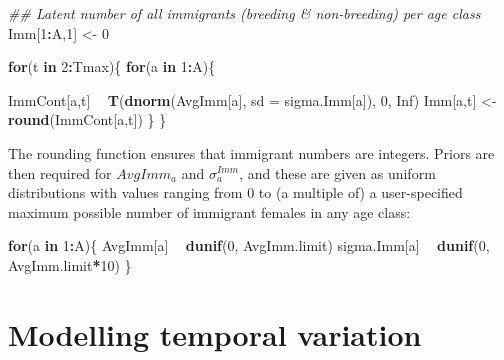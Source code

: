 \documentclass[
]{book}
\newenvironment{Shaded}{\begin{snugshade}}{\end{snugshade}}
\newcommand{\CommentTok}[1]{\textcolor[rgb]{0.56,0.35,0.01}{\textit{#1}}}
\newcommand{\ControlFlowTok}[1]{\textcolor[rgb]{0.13,0.29,0.53}{\textbf{#1}}}
\newcommand{\DataTypeTok}[1]{\textcolor[rgb]{0.13,0.29,0.53}{#1}}
\newcommand{\DecValTok}[1]{\textcolor[rgb]{0.00,0.00,0.81}{#1}}
\newcommand{\KeywordTok}[1]{\textcolor[rgb]{0.13,0.29,0.53}{\textbf{#1}}}
\newcommand{\NormalTok}[1]{#1}
\newcommand{\OperatorTok}[1]{\textcolor[rgb]{0.81,0.36,0.00}{\textbf{#1}}}
\newcommand{\OtherTok}[1]{\textcolor[rgb]{0.56,0.35,0.01}{#1}}
\newcommand{\StringTok}[1]{\textcolor[rgb]{0.31,0.60,0.02}{#1}}
\begin{document}
\begin{Shaded}
\begin{Highlighting}[]
     \CommentTok{## Latent number of all immigrants (breeding & non-breeding) per age class}
\NormalTok{     Imm[}\DecValTok{1}\OperatorTok{:}\NormalTok{A,}\DecValTok{1}\NormalTok{] <-}\StringTok{ }\DecValTok{0}

     \ControlFlowTok{for}\NormalTok{(t }\ControlFlowTok{in} \DecValTok{2}\OperatorTok{:}\NormalTok{Tmax)\{}
       \ControlFlowTok{for}\NormalTok{(a }\ControlFlowTok{in} \DecValTok{1}\OperatorTok{:}\NormalTok{A)\{}

\NormalTok{         ImmCont[a,t] }\OperatorTok{~}\StringTok{ }\KeywordTok{T}\NormalTok{(}\KeywordTok{dnorm}\NormalTok{(AvgImm[a], }\DataTypeTok{sd =}\NormalTok{ sigma.Imm[a]), }\DecValTok{0}\NormalTok{, }\OtherTok{Inf}\NormalTok{)}
\NormalTok{         Imm[a,t] <-}\StringTok{ }\KeywordTok{round}\NormalTok{(ImmCont[a,t])}
\NormalTok{       \}}
\NormalTok{     \}}
\end{Highlighting}
\end{Shaded}

The rounding function ensures that immigrant numbers are integers.
Priors are then required for \(AvgImm_a\) and \(\sigma_a^{Imm}\), and these are
given as uniform distributions with values ranging from 0 to (a multiple of) a
user-specified maximum possible number of immigrant females in any age class:

\begin{Shaded}
\begin{Highlighting}[]
\ControlFlowTok{for}\NormalTok{(a }\ControlFlowTok{in} \DecValTok{1}\OperatorTok{:}\NormalTok{A)\{}
\NormalTok{  AvgImm[a] }\OperatorTok{~}\StringTok{ }\KeywordTok{dunif}\NormalTok{(}\DecValTok{0}\NormalTok{, AvgImm.limit)}
\NormalTok{  sigma.Imm[a] }\OperatorTok{~}\StringTok{ }\KeywordTok{dunif}\NormalTok{(}\DecValTok{0}\NormalTok{, AvgImm.limit}\OperatorTok{*}\DecValTok{10}\NormalTok{)}
\NormalTok{\}}
\end{Highlighting}
\end{Shaded}

\hypertarget{TempVar}{%
\chapter{Modelling temporal variation}\label{TempVar}}
\end{document}
